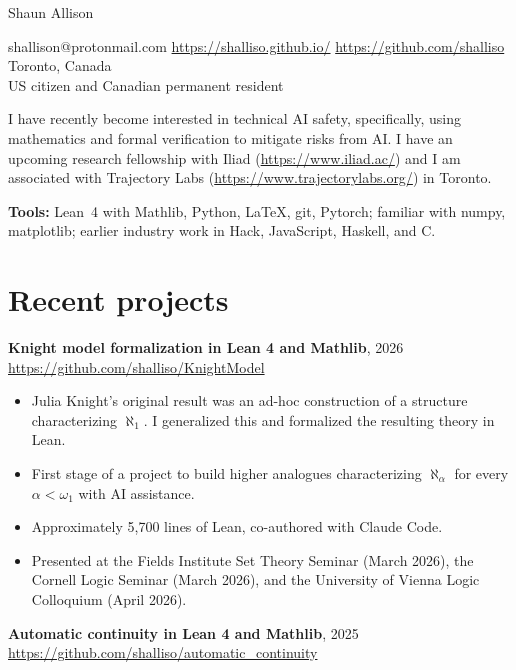 \documentclass[letterpaper]{article}
\def\name{Shaun Allison}
\begin{document}
{\huge \name}

\vspace{0.16in}

shallison@protonmail.com \quad\textbullet\quad
\url{https://shalliso.github.io/} \quad\textbullet\quad
\url{https://github.com/shalliso}\\
Toronto, Canada\\
US citizen and Canadian permanent resident

\vspace{0.16in}

I have recently become interested in technical AI safety, specifically, using mathematics and formal verification to mitigate risks from AI.
I have an upcoming research fellowship with Iliad (\url{https://www.iliad.ac/}) and I am associated with Trajectory Labs (\url{https://www.trajectorylabs.org/}) in Toronto.

\smallskip
\textbf{Tools:} Lean~4 with Mathlib, Python, \LaTeX{}, git, Pytorch; familiar with numpy, matplotlib; earlier industry work in Hack, JavaScript, Haskell,
and C.

\section*{Recent projects}

\textbf{Knight model formalization in Lean 4 and Mathlib}, 2026\\
\url{https://github.com/shalliso/KnightModel}

\begin{itemize}
  \item Julia Knight's original result was an ad-hoc construction of a
        structure characterizing $\aleph_1$. I generalized this and
        formalized the resulting theory in Lean.
  \item First stage of a project to build higher analogues characterizing
        $\aleph_\alpha$ for every $\alpha < \omega_1$ with AI assistance.
  \item Approximately 5{,}700 lines of Lean, co-authored with Claude Code.
  \item Presented at the Fields Institute Set Theory Seminar (March 2026), the
        Cornell Logic Seminar (March 2026), and the University of Vienna Logic
        Colloquium (April 2026).
\end{itemize}

\medskip
\textbf{Automatic continuity in Lean 4 and Mathlib}, 2025\\
\url{https://github.com/shalliso/automatic_continuity}
\end{document}
